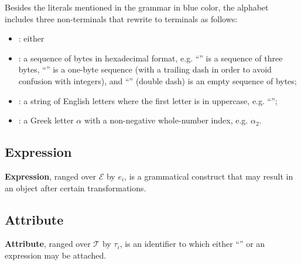 Besides the literals mentioned in the grammar in blue color, the
alphabet includes three non-terminals that rewrite to terminals as follows:
\begin{itemize}
  \item {}: either 
  \item {}: a sequence of bytes in hexadecimal format, e.g. ``'' is a sequence of three bytes, ``'' is a one-byte sequence (with a trailing dash in order to avoid confusion with integers), and ``\ff{-{}-}'' (double dash) is an empty sequence of bytes;
  \item {}: a string of English letters where the first letter is in uppercase, e.g. ``'';
  \item {}: a Greek letter \(\alpha\) with a non-negative whole-number index, e.g. \(\alpha_2\).
\end{itemize}

\subsection{Expression}\label{sec:expression}

\begin{definition}[Expression]
\textbf{Expression}, ranged over \(\mathcal{E}\) by \(e_i\),
is a grammatical construct that may result in an object after
certain transformations.
\end{definition}

\subsection{Attribute}\label{sec:attribute}

\begin{definition}[Attribute]
\textbf{Attribute}, ranged over \(\mathcal{T}\) by \(\tau_i\),
is an identifier to which either ``\stx{\varnothing}'' or an expression
may be attached.
\end{definition}

